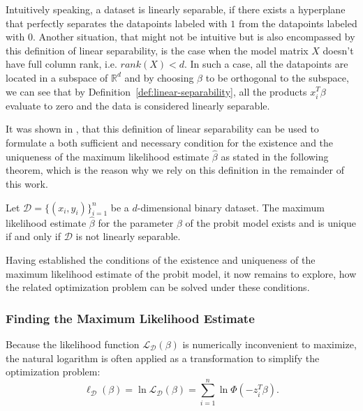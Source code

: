 \noindent Intuitively speaking, a dataset is linearly separable, if there
exists a hyperplane that perfectly separates the datapoints labeled
with $1$ from the datapoints labeled with $0$.
Another situation, that might not be intuitive but is also
encompassed by this definition of linear separability, is the
case when the model matrix $X$ doesn't have full column rank,
i.e. $rank(X) < d$. In such a case, all the datapoints are
located in a subspace of $\mathbb{R}^d$ and by choosing
$\beta$ to be orthogonal to the subspace, we can see that
by Definition~\ref{def:linear-separability}, all the
products $x_i^T \beta$ evaluate to zero and the data is
considered linearly separable.

It was shown in \cite{probit-existence}, that this definition of
linear separability can be used to formulate a both
sufficient and necessary condition for the existence
and the uniqueness of the maximum likelihood estimate
$\hat{\beta}$ as stated in the following theorem,
which is the reason why we rely on this definition
in the remainder of this work.

\begin{theorem}
    \label{theorem:probit-existence}
    Let $\mathcal{D}=\{(x_i, y_i)\}_{i=1}^n$ be a $d$-dimensional
    binary dataset.
    The maximum likelihood estimate $\hat{\beta}$ for the
    parameter $\beta$ of the probit model
    exists and is unique if and only if $\mathcal{D}$
    is not linearly separable.
\end{theorem}

\noindent Having established the conditions of the existence
and uniqueness of the maximum likelihood estimate of
the probit model, it now remains to explore,
how the related optimization
problem can be solved under these conditions.

\subsubsection{Finding the Maximum Likelihood Estimate}

Because the likelihood function $\mathcal{L}_\mathcal{D}(\beta)$ is
numerically inconvenient to maximize, the natural logarithm is often
applied as a transformation to simplify the optimization problem:
\begin{equation}
    \ell_\mathcal{D}(\beta) = \ln \mathcal{L}_\mathcal{D}(\beta) = \sum_{i=1}^n \ln \Phi(- z_i^T \beta).
\end{equation}

